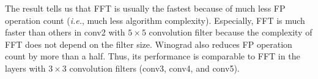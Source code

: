  The result tells us that \textsf{FFT} is usually the fastest because of much less FP operation count (\textit{i.e.}, much less algorithm complexity). Especially, \textsf{FFT} is much faster than others in \textsf{conv2} with $5 \times 5$ convolution filter because the complexity of \textsf{FFT} does not depend on the filter size. \textsf{Winograd} also reduces FP operation count by more than a half. Thus, its performance is comparable to \textsf{FFT} in the layers with $3 \times 3$ convolution filters (\textsf{conv3}, \textsf{conv4}, and \textsf{conv5}).
